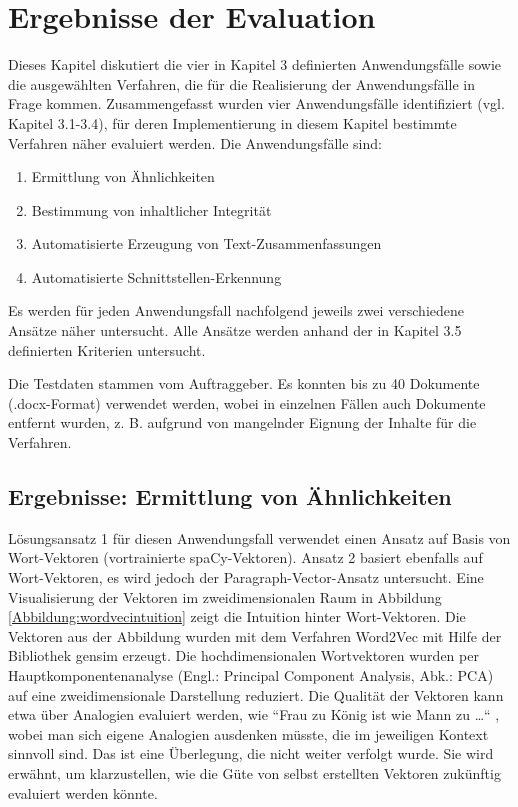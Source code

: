 \chapter{Ergebnisse der Evaluation}
\label{chap4}

Dieses Kapitel diskutiert die vier in Kapitel 3 definierten Anwendungsfälle sowie die ausgewählten Verfahren, die für die Realisierung der Anwendungsfälle in Frage kommen. Zusammengefasst wurden vier Anwendungsfälle identifiziert (vgl. Kapitel 3.1-3.4), für deren Implementierung in diesem Kapitel bestimmte Verfahren näher evaluiert werden. Die Anwendungsfälle sind:

\begin{enumerate}
  \item Ermittlung von Ähnlichkeiten
  \item Bestimmung von inhaltlicher Integrität
  \item Automatisierte Erzeugung von Text-Zusammenfassungen
  \item Automatisierte Schnittstellen-Erkennung
\end{enumerate}

Es werden für jeden Anwendungsfall nachfolgend jeweils zwei verschiedene Ansätze näher untersucht. Alle Ansätze werden anhand der in Kapitel 3.5 definierten Kriterien untersucht.

Die Testdaten stammen vom Auftraggeber. Es konnten bis zu 40 Dokumente (.docx-Format) verwendet werden, wobei in einzelnen Fällen auch Dokumente entfernt wurden, z. B. aufgrund von mangelnder Eignung der Inhalte für die Verfahren. 

\section{Ergebnisse: Ermittlung von Ähnlichkeiten}

Lösungsansatz 1 für diesen Anwendungsfall verwendet einen Ansatz auf Basis von Wort-Vektoren (vortrainierte spaCy-Vektoren). Ansatz 2 basiert ebenfalls auf Wort-Vektoren, es wird jedoch der Paragraph-Vector-Ansatz untersucht. Eine Visualisierung der Vektoren im zweidimensionalen Raum in Abbildung \ref{Abbildung:wordvecintuition} zeigt die Intuition hinter Wort-Vektoren. Die Vektoren aus der Abbildung wurden mit dem Verfahren Word2Vec mit Hilfe der Bibliothek gensim erzeugt. Die hochdimensionalen Wortvektoren wurden per Hauptkomponentenanalyse (Engl.: Principal Component Analysis, Abk.: PCA)  auf eine zweidimensionale Darstellung reduziert. Die Qualität der Vektoren kann etwa über Analogien evaluiert werden, wie ``Frau zu König ist wie Mann zu …`` \cite{rehurek2}, wobei man sich eigene Analogien ausdenken müsste, die im jeweiligen Kontext sinnvoll sind. Das ist eine Überlegung, die nicht weiter verfolgt wurde. Sie wird erwähnt, um klarzustellen, wie die Güte von selbst erstellten Vektoren zukünftig evaluiert werden könnte. 


